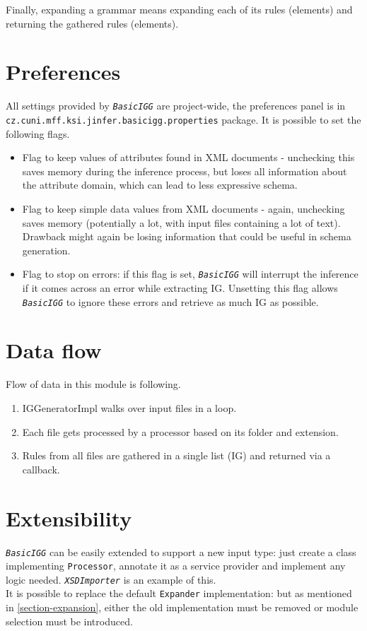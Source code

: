 \documentclass[a4paper,10pt,oneside]{article}
\newcommand{\code}[1]{\texttt{#1}}
\newcommand{\jmodule}[1]{\texttt{\textit{#1}}}
\begin{document}
Finally, expanding a grammar means expanding each of its rules (elements) and returning the gathered rules (elements).

\section{Preferences}

All settings provided by \jmodule{BasicIGG} are project-wide, the preferences panel is in \code{cz.cuni.mff.ksi.jinfer.basicigg.properties} package. It is possible to set the following flags. 
\begin{itemize}
	\item Flag to keep values of attributes found in XML documents - unchecking this saves memory during the inference process, but loses all information about the attribute domain, which can lead to less expressive schema.
	\item Flag to keep simple data values from XML documents - again, unchecking saves memory (potentially a lot, with input files containing a lot of text). Drawback might again be losing information that could be useful in schema generation.
	\item Flag to stop on errors: if this flag is set, \jmodule{BasicIGG} will interrupt the inference if it comes across an error while extracting IG. Unsetting this flag allows \jmodule{BasicIGG} to ignore these errors and retrieve as much IG as possible.
\end{itemize}

\section{Data flow}

Flow of data in this module is following.
\begin{enumerate}
	\item IGGeneratorImpl walks over input files in a loop.
	\item Each file gets processed by a processor based on its folder and extension.
	\item Rules from all files are gathered in a single list (IG) and returned via a callback.
\end{enumerate}

\section{Extensibility}

\jmodule{BasicIGG} can be easily extended to support a new input type: just create a class implementing \code{Processor}, annotate it as a service provider and implement any logic needed. \jmodule{XSDImporter} is an example of this.\\

It is possible to replace the default \code{Expander} implementation: but as mentioned in \ref{section-expansion}, either the old implementation must be removed or module selection must be introduced.

\nocite{*}
\newpage


\end{document}
